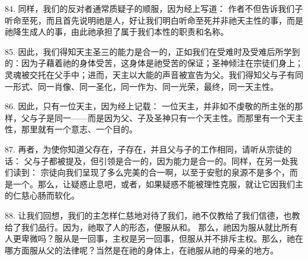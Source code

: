 \par

84. 同样，我们的反对者通常质疑子的顺服，因为经上写道：  作者不但告诉我们子听命至死，而且首先说明祂是人，好让我们明白听命至死并非祂天主性的事，而是祂降生成人的事，由此祂承担了属于我们本性的职责和名称。\par

85. 因此，我们得知天主圣三的能力是合一的，正如我们在受难时及受难后所学到的：因为子藉着祂的身体受苦，这身体是祂受苦的保证；圣神倾注在宗徒们身上；灵魂被交托在父手中；进而，天主以大能的声音被宣告为父。我们得知父与子有同一形式、同一肖像、同一圣化，同一作为、同一光荣，最终，同一天主性。\par

86. 因此，只有一位天主，因为经上记载：  一位天主，并非如不虔敬的所主张的那样，父与子是同一——而是因为父、子及圣神只有一个天主性。而那里有一个天主性，那里就有一个意志、一个目的。\par

87. 再者，为使你知道父存在，子存在，并且父与子的工作相同，请听从宗徒的话：  父与子都被提及，但引领是合一的，因为能力是合一的。同样，在另一处我们读到：  宗徒向我们呈现了多么完美的合一啊，以至于安慰的泉源不是多个，而是一个。那么，让疑惑止息吧，或者，如果疑惑不能被理性克服，就让它因我们主的仁慈心肠而软化。\par

88. 让我们回想，我们的主怎样仁慈地对待了我们，祂不仅教给了我们信德，也教给了我们品行。因为，祂取了人的形态，便服从和。 那么，祂因为服从就比所有人更卑微吗？服从是一回事，主权是另一回事，但服从并不排斥主权。那么，祂在哪方面服从父的法律呢？当然是在祂的身体上，在祂服从祂的母亲的地方。\par

\par

